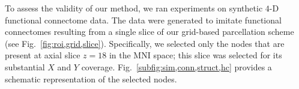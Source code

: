 \newcommand{\calI}{\xmath{\mathcal{I}}}
\newcommand{\calK}{\xmath{\mathcal{K}}}
\newcommand{\calC}{\xmath{\mathcal{C}}}
\newcommand{\calE}{\xmath{\mathcal{E}}}
\newcommand{\calN}{\xmath{\mathcal{N}}}
To assess the validity of our method, we ran experiments on synthetic $4$-D functional connectome data.
The data were generated to imitate functional connectomes resulting from a single slice of our grid-based parcellation scheme (see Fig.~\ref{fig:roi,grid,slice}).
Specifically, we selected only the nodes that are present at axial slice $z=18$ in the MNI space; this slice was selected for its substantial $X$ and $Y$ coverage.
Fig.~\ref{subfig:sim,conn,struct,hc} provides a schematic representation of the selected nodes.

